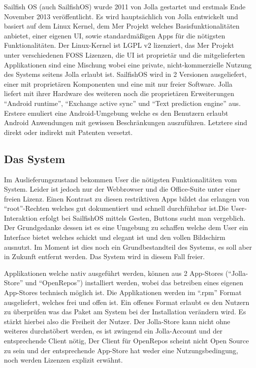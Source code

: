 Sailfish OS (auch \mbox{SailfishOS}) wurde 2011 von Jolla gestartet und erstmals Ende November 2013\cite{online:jolla-about} veröffentlicht. Es wird hauptsächlich von Jolla entwickelt und basiert auf dem Linux Kernel, dem Mer Projekt welches Basisfunktionalitäten anbietet, einer eigenen UI, sowie standardmäßigen Apps für die nötigsten Funktionalitäten\cite{online:sailfish-about}. Der Linux-Kernel ist LGPL v2 lizenziert\cite{online:kernel-license}, das Mer Projekt unter verschiedenen FOSS Lizenzen\cite{online:mer-license}, die UI ist proprietär und die mitgelieferten Applikationen sind eine Mischung\cite{online:sailfish-about} wobei eine private, nicht-kommerzielle Nutzung des Systems seitens Jolla erlaubt ist\cite{online:sailfish-eula}. \mbox{SailfishOS} wird in 2 Versionen ausgeliefert, einer mit proprietären Komponenten und eine mit nur freier Software. Jolla liefert mit ihrer Hardware des weiteren noch die proprietären Erweiterungen\cite{online:sailfish-about} ``Android runtime''\cite{online:sailfish-android-runtime-licensor}, ``Exchange active sync''\cite{online:microsoft-eas} und ``Text prediction engine''\cite{online:jolla-xt9}\cite{online:xt9-license} aus. Erstere emuliert eine Android-Umgebung welche es den Benutzern erlaubt Android Anwendungen mit gewissen Beschränkungen auszuführen\cite{online:sailfish-android-runtime}. Letztere sind direkt oder indirekt mit Patenten versetzt.\\

\subsection{Das System}
Im Auslieferungszustand bekommen User die nötigsten Funktionalitäten vom System. Leider ist jedoch nur der Webbrowser und die Office-Suite unter einer freien Lizenz\cite{online:sailfish-about}. Einen Kontrast zu diesen restriktiven Apps bildet das erlangen von ``root''-Rechten welches gut dokumentiert und schnell durchführbar ist\cite{online:sailfish-root}.Die User-Interaktion erfolgt bei SailfishOS mittels Gesten, Buttons sucht man vergeblich. Der Grundgedanke dessen ist es eine Umgebung zu schaffen welche dem User ein Interface bietet welches schickt und elegant ist und den vollen Bildschirm ausnutzt\cite{online:sailfish-ui}. Im Moment ist dies noch ein Grundbestandteil des Systems, es soll aber in Zukunft entfernt werden\cite{online:sailfish-about}. Das System wird in diesem Fall freier. 

Applikationen welche nativ ausgeführt werden, können aus 2 App-Stores (``Jolla-Store'' und ``OpenRepos''\cite{online:openrepos}) installiert werden, wobei das betreiben eines eigenen App-Stores technisch möglich ist. Die Applikationen werden im ``\mbox{.rpm}'' Format ausgeliefert, welches frei und offen\cite{online:rpm-license} ist. Ein offenes Format erlaubt es den Nutzern zu überprüfen was das Paket am System bei der Installation verändern wird. Es stärkt hierbei also die Freiheit der Nutzer. Der Jolla-Store kann nicht ohne weiteres durchstöbert werden, es ist zwingend ein Jolla-Account und der entsprechende Client nötig\cite{online:jolla-store}, Der Client für OpenRepos scheint nicht Open Source zu sein und der entsprechende App-Store hat weder eine Nutzungsbedingung, noch werden Lizenzen explizit erwähnt.

